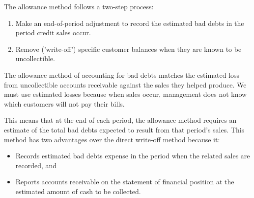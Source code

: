 \documentclass[../main.tex]{subfiles}
\begin{document}
	The allowance method follows a two-step process:
	\begin{enumerate}[noitemsep]
		\item Make an end-of-period adjustment to record the estimated bad 
		debts in the period credit sales occur. 
		\item Remove ('write-off') specific customer balances when they are 
		known to be uncollectible. 
	\end{enumerate}
	
	The allowance method of accounting for bad debts matches the estimated loss 
	from uncollectible accounts receivable against the sales they helped 
	produce. We must use estimated losses because when sales occur, management 
	does not know which customers will not pay their bills. 
	
	This means that at 
	the end of each period, the allowance method requires an estimate of the 
	total bad debts expected to result from that period’s sales. This method 
	has two advantages over the direct write-off method because it: 
	\begin{itemize}[noitemsep]
		\item Records estimated bad debts expense in the period when the 
		related sales are recorded, and 
		\item Reports accounts receivable on the statement of financial 
		position at the estimated amount of cash to be collected.
	\end{itemize}
	
\end{document}
